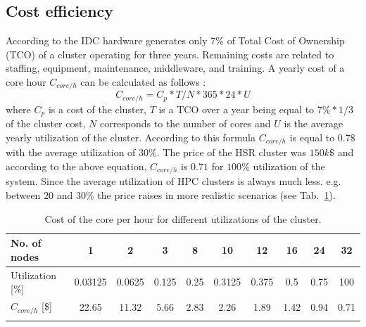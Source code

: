 \documentclass[3p,times]{elsarticle}
\begin{document}
\subsection{Cost efficiency}

According to the IDC \cite{Perry2007} hardware generates only 7\% of Total Cost of Ownership (TCO) of a cluster operating for three years. Remaining costs are related to staffing, equipment, maintenance, middleware, and training. A yearly cost of a core hour $C_{core/h}$ can be calculated as follows \cite{ubercloud}:
$$ 
C_{core/h} = { C_p * T } / { N * 365 * 24 * U } 
$$
where $C_p$ is a cost of the cluster, $T$ is a TCO over a year being equal to $7\% * 1/3$ of the cluster cost, $N$ corresponds to the number of cores and $U$ is the average yearly utilization of the cluster. According to this formula $C_{core/h}$ is equal to $0.7\$$ with the average utilization of $30\%$. The price of the HSR cluster was $150k\$$ and according to the above equation, $C_{core/h}$ is $0.71$ for $100\%$ utilization of the system. Since the average utilization of HPC clusters is always much less. e.g. between $20$ and $30 \%$ \cite{Delimitrou:2014:QRQ:2541940.2541941} the price raises in more realistic scenarios (see Tab.~\ref{tab:cost}).

\begin{table}[h]
\begin{tabular}{lccccccccc}
\hline
\multicolumn{1}{|l|}{No. of nodes}          & \multicolumn{1}{c|}{1}       & \multicolumn{1}{c|}{2}      & \multicolumn{1}{c|}{3}     & \multicolumn{1}{c|}{8}    & \multicolumn{1}{c|}{10}     & \multicolumn{1}{c|}{12}    & \multicolumn{1}{c|}{16}   & \multicolumn{1}{c|}{24}   & \multicolumn{1}{c|}{32}   \\ \hline
\multicolumn{1}{|l|}{Utilization {[}\%{]}}  & \multicolumn{1}{c|}{0.03125} & \multicolumn{1}{c|}{0.0625} & \multicolumn{1}{c|}{0.125} & \multicolumn{1}{c|}{0.25} & \multicolumn{1}{c|}{0.3125} & \multicolumn{1}{c|}{0.375} & \multicolumn{1}{c|}{0.5}  & \multicolumn{1}{c|}{0.75} & \multicolumn{1}{c|}{100}  \\ \hline
\multicolumn{1}{|l|}{$C_{core/h}$ {[}\${]}} & \multicolumn{1}{c|}{22.65}   & \multicolumn{1}{c|}{11.32}  & \multicolumn{1}{c|}{5.66}  & \multicolumn{1}{c|}{2.83} & \multicolumn{1}{c|}{2.26}   & \multicolumn{1}{c|}{1.89}  & \multicolumn{1}{c|}{1.42} & \multicolumn{1}{c|}{0.94} & \multicolumn{1}{c|}{0.71} \\ \hline
                                            & \multicolumn{1}{l}{}         & \multicolumn{1}{l}{}        & \multicolumn{1}{l}{}       & \multicolumn{1}{l}{}      & \multicolumn{1}{l}{}        & \multicolumn{1}{l}{}       & \multicolumn{1}{l}{}      & \multicolumn{1}{l}{}      & \multicolumn{1}{l}{}     
\end{tabular}
\label{tab:cost}
\caption{Cost of the core per hour for different utilizations of the cluster. }
\end{table}
\end{document}
